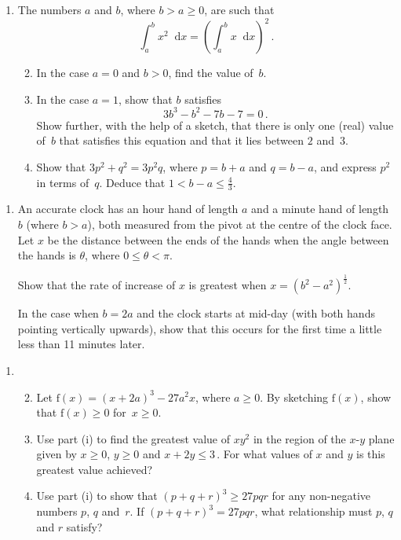 \documentclass[a4, 11pt]{report}
\newlength{\qspace}
\newcounter{qnumber}
\newenvironment{question}%
 {\vspace{\qspace}
  \begin{enumerate}[\bfseries 1\quad][10]%
    \setcounter{enumi}{\value{qnumber}}%
    \item%
 }
{
  \end{enumerate}
  \filbreak
  \stepcounter{qnumber}
 }
\newenvironment{questionparts}[1][1]%
 {
  \begin{enumerate}[\bfseries (i)]%
    \setcounter{enumii}{#1}
    \addtocounter{enumii}{-1}
    \setlength{\itemsep}{5mm}
    \setlength{\parskip}{8pt}
 }
 {
  \end{enumerate}
 }
\def\le{\leqslant}
\def\ge{\geqslant}
\renewcommand{\.}[1]{\ensuremath{\mathrm{#1}}}
\newcommand{\+}[1]{\ensuremath{\mathbf{#1}}}
\newcommand{\ud}{\mathop{}\!\mathrm{d}}
\begin{document}
\begin{question}
 The numbers $a$ and $b$, where $b>a\ge0$,  are such that 
  \[
  \int_a^b x^2 \ud x = \left ( \int_a^b x \ud x\right)^{\!\!2}\,.
  \]

  \begin{questionparts}
  \item In the case $a=0$ and $b>0$, find the  value of~$b$.

  \item In the case $a=1$, show that $b$ satisfies
    \[
    3b^3 -b^2-7b -7 =0\,.
    \]
    Show further, with the help of a sketch, that there is only one
    (real) value of~$b$ that satisfies this equation and that it lies
    between $2$ and~$3$.

  \item Show that  $3p^2 + q^2 = 3p^2q$, 
    where $p=b+a$ and $q=b-a$, and express $p^2$ in terms of~$q$. 
   Deduce that $1<b-a\le\frac43$.

  \end{questionparts}
\end{question}

\begin{question}
  An accurate clock has an hour hand of length $a$ and a minute hand
  of length $b$ (where $b>a$), both measured from the pivot at the
  centre of the clock face. Let $x$ be the  distance between the ends
  of the hands when the angle between the hands is $\theta$, where
$0\le\theta<\pi$. 

Show that the rate of increase of $x$ is  greatest
  when $x=(b^2-a^2)^\frac12$.

  In the case when $b=2a$ and the clock starts at mid-day (with both
  hands pointing vertically upwards), show that this occurs for the
  first time a little less than 11 minutes later.
\end{question}

\begin{question}
  \begin{questionparts}
\item
Let $\.f(x) = (x+2a)^3 -27 a^2 x$, where $a\ge 0$. 
 By sketching  $\.f(x)$, show that $\.f(x)\ge 0$ for~$x \ge0$. 


    \item Use part (i) to 
find the greatest value of $xy^2$ in the region of the 
$x$-$y$ plane given by $x\ge0$, $y\ge0$ and $x+2y\le 3\,$.
For what values of $x$ and $y$ is this greatest value achieved?

\item Use part (i) to show that 
   $(p+q+r)^3 \ge 27pqr$
    for any non-negative numbers $p$, $q$ and~$r$.
 If 
   $(p+q+r)^3 =   27pqr$,
 what relationship must $p$, $q$ and $r$
    satisfy? 

  \end{questionparts}

\end{question}
	
\end{document}
